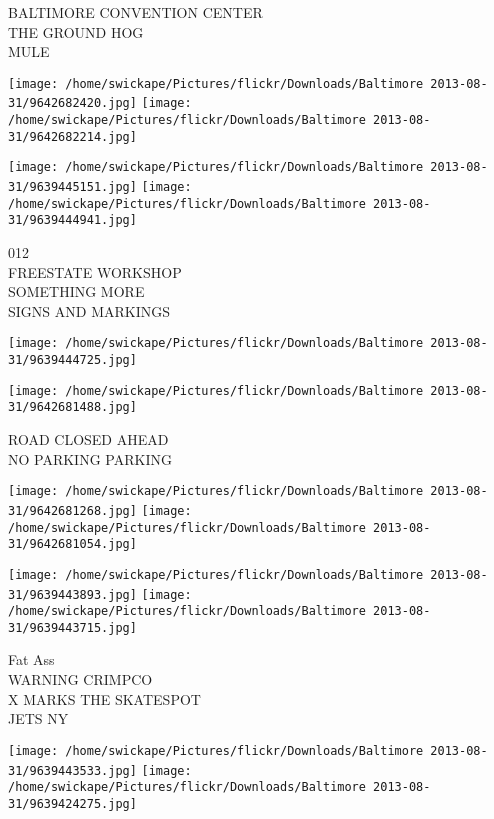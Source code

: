 \documentclass[10pt,letterpaper]{article}
\begin{document}
BALTIMORE CONVENTION CENTER\\
THE GROUND HOG\\
MULE\\
\pagebreak

\texttt{[image: /home/swickape/Pictures/flickr/Downloads/Baltimore 2013-08-31/9642682420.jpg]}
\texttt{[image: /home/swickape/Pictures/flickr/Downloads/Baltimore 2013-08-31/9642682214.jpg]}

\texttt{[image: /home/swickape/Pictures/flickr/Downloads/Baltimore 2013-08-31/9639445151.jpg]}
\texttt{[image: /home/swickape/Pictures/flickr/Downloads/Baltimore 2013-08-31/9639444941.jpg]}

012\\
FREESTATE WORKSHOP\\
SOMETHING MORE\\
SIGNS AND MARKINGS\\
\pagebreak

\texttt{[image: /home/swickape/Pictures/flickr/Downloads/Baltimore 2013-08-31/9639444725.jpg]}

\vspace{0.25in}
\texttt{[image: /home/swickape/Pictures/flickr/Downloads/Baltimore 2013-08-31/9642681488.jpg]}

ROAD CLOSED AHEAD\\
NO PARKING PARKING\\
\pagebreak

\texttt{[image: /home/swickape/Pictures/flickr/Downloads/Baltimore 2013-08-31/9642681268.jpg]}
\texttt{[image: /home/swickape/Pictures/flickr/Downloads/Baltimore 2013-08-31/9642681054.jpg]}

\texttt{[image: /home/swickape/Pictures/flickr/Downloads/Baltimore 2013-08-31/9639443893.jpg]}
\texttt{[image: /home/swickape/Pictures/flickr/Downloads/Baltimore 2013-08-31/9639443715.jpg]}

Fat Ass\\
WARNING CRIMPCO\\
X MARKS THE SKATESPOT\\
JETS NY\\
\pagebreak

\texttt{[image: /home/swickape/Pictures/flickr/Downloads/Baltimore 2013-08-31/9639443533.jpg]}
\texttt{[image: /home/swickape/Pictures/flickr/Downloads/Baltimore 2013-08-31/9639424275.jpg]}
\end{document}
